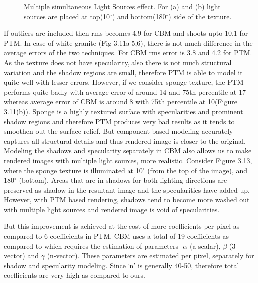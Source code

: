 \begin{figure}[p]
\centering
{}
\caption{Multiple simultaneous Light Sources effect. For (a) and (b) light sources are placed at top(10$^{\circ}$) 
and bottom(180$^{\circ}$) side 
of the texture.}
\end{figure}
If outliers are included then rms becomes 4.9 for CBM and shoots upto 10.1 for PTM.
In case of white granite (Fig 3.11a-5,6), there is not
much difference in the average errors of the two techniques. For CBM rms error is 3.8 and 4.2 for PTM. As the texture does
not have specularity, also there is not much structural variation and the shadow
regions are small, therefore PTM is able to model it quite well with lesser
errors. However, if we consider sponge texture, the PTM performs quite badly
with average error of around 14 and 75th percentile at 17 whereas average error
of CBM is around 8 with 75th percentile at 10(Figure 3.11(b)). Sponge is a highly
textured surface with specularities and prominent shadow regions and therefore
PTM produces very bad results as it tends to smoothen out the surface relief.
But component based modeling accurately captures all structural details and thus
rendered image is closer to the original.
Modeling the shadows and specularity separately in CBM also allows us to make rendered images with
multiple light sources, more realistic. Consider Figure 3.13,
where the sponge texture
is illuminated at 10$^{\circ}$ (from the top of the image), and 180$^{\circ}$
(bottom). Areas that are in shadows for both lighting directions are preserved
as shadow in the resultant image and the specularities have added up. However, with PTM based rendering, shadows tend
to become more washed out with multiple light sources and rendered image is void of specularities.

But this improvement is achieved at the cost of more coefficients per pixel as compared to 6 coefficients in PTM.
CBM uses a total of 19 coefficients as compared to \cite{chap2-9} which requires the estimation of parameters- $\alpha$ (a scalar), 
$\beta$ (3-vector) and $\gamma$ (n-vector). These parameters are estimated per pixel, separately for shadow and specularity
modeling. Since `n' is generally 40-50, therefore total coefficients are very high as compared to ours.

